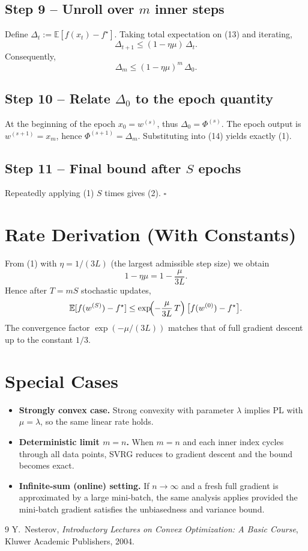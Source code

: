 \documentclass{article}
\begin{document}
\subsection*{Step 9 – Unroll over $m$ inner steps}
Define $\Delta_t:=\mathbb{E}[f(x_t)-f^\star]$. Taking total expectation on (13) and iterating,
\[
\Delta_{t+1}\le (1-\eta\mu)\,\Delta_t .
\]
Consequently,
\[
\Delta_m \le (1-\eta\mu)^{m}\,\Delta_0 .
\tag{14}
\]

\subsection*{Step 10 – Relate $\Delta_0$ to the epoch quantity}
At the beginning of the epoch $x_0=w^{(s)}$, thus $\Delta_0=\Phi^{(s)}$. The epoch output is $w^{(s+1)}=x_m$, hence $\Phi^{(s+1)}=\Delta_m$. Substituting into (14) yields exactly (1).

\subsection*{Step 11 – Final bound after $S$ epochs}
Repeatedly applying (1) $S$ times gives (2). $\square$

\section*{Rate Derivation (With Constants)}
From (1) with $\eta=1/(3L)$ (the largest admissible step size) we obtain
\[
1-\eta\mu = 1-\frac{\mu}{3L} .
\]
Hence after $T=mS$ stochastic updates,
\[
\mathbb{E}[f(w^{(S)})-f^\star]
\le \exp\!\Bigl(-\frac{\mu}{3L}\,T\Bigr)\,
   \bigl[f(w^{(0)})-f^\star\bigr] .
\]
The convergence factor $\exp(-\mu/(3L))$ matches that of full gradient descent up to the constant $1/3$.

\section*{Special Cases}
\begin{itemize}
\item \textbf{Strongly convex case.} Strong convexity with parameter $\lambda$ implies PL with $\mu=\lambda$, so the same linear rate holds.
\item \textbf{Deterministic limit $m=n$.} When $m=n$ and each inner index cycles through all data points, SVRG reduces to gradient descent and the bound becomes exact.
\item \textbf{Infinite‑sum (online) setting.} If $n\to\infty$ and a fresh full gradient is approximated by a large mini‑batch, the same analysis applies provided the mini‑batch gradient satisfies the unbiasedness and variance bound.
\end{itemize}

\begin{thebibliography}{9}
Y.~Nesterov, \emph{Introductory Lectures on Convex Optimization: A Basic Course}, Kluwer Academic Publishers, 2004.
\end{thebibliography}
\end{document}
